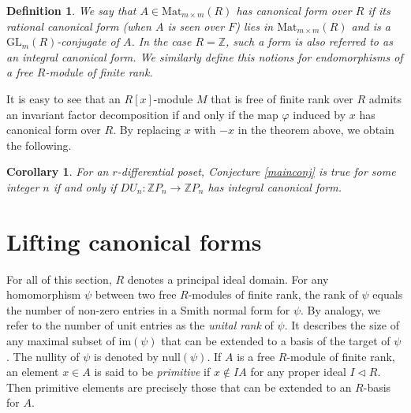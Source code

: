 \documentclass[11pt]{article}
\newtheorem{corollary}[theo]{Corollary}
\newtheorem{definition}[theo]{Definition}
\theoremstyle{definition}
\numberwithin{equation}{section}
\newcommand{\ZZ}{\mathbb{Z}}
\newcommand{\GL}{\mathrm{GL}}
\begin{document}
\begin{definition} We say that $ A \in \mathrm{Mat}_{m \times m }(R) $ has \emph{canonical form over $ R $}     if its rational canonical form (when $ A $ is seen over $ F$) lies in $ \mathrm{Mat}_{m \times m }(R) $ and is a $ \GL_{m}(R) $-conjugate of $ A $. In the case $ R = \ZZ $, such a form is also  referred to as an \emph{integral canonical form}.    
We similarly define this notions for endomorphisms of a  free $ R  $-module of finite rank.   \end{definition}                        
It is easy to see that an $ R[x]$-module $ M $ that is free of finite rank over $ R $ admits an invariant factor decomposition if and only if the map $ \varphi $ induced by $ x $  has canonical form over $ R $. By replacing $ x $ with $-x $ in the theorem above, we obtain  the following.                                                                                                                        
\begin{corollary}  \label{RCFEquivMiller}  For  an  $ r $-differential poset, Conjecture \ref{mainconj} is true for some integer  $ n $ if and only if  
$ DU_{n} : \ZZ P_{n} \to \ZZ  P_{n}    $  
has  integral  canonical form.     
\end{corollary}





\section{Lifting canonical forms}  

For all of this section, $  R $ denotes  a  principal ideal domain. For any homomorphism $ \psi $ between two free $R$-modules of finite rank,  the rank of $  \psi $ equals the number of non-zero entries in a Smith normal form for $ \psi $.  By analogy, we refer to the number of unit entries as the  \emph{unital  rank} of $ \psi $. It describes the  size of any maximal subset  of  $ \mathrm{im}(\psi) $ that can be extended to a basis of the target of  $ \psi $. The nullity of $ \psi $ is denoted by $ \mathrm{null}(\psi) $.       %
If $ A $ is a free $R$-module of finite rank, an element $ x \in A $ is said to be \emph{primitive} if $ x \notin IA $ for any proper ideal $ I \triangleleft R $.  Then primitive elements are precisely those that can be extended to an $ R$-basis for   $A $.   
\end{document}
